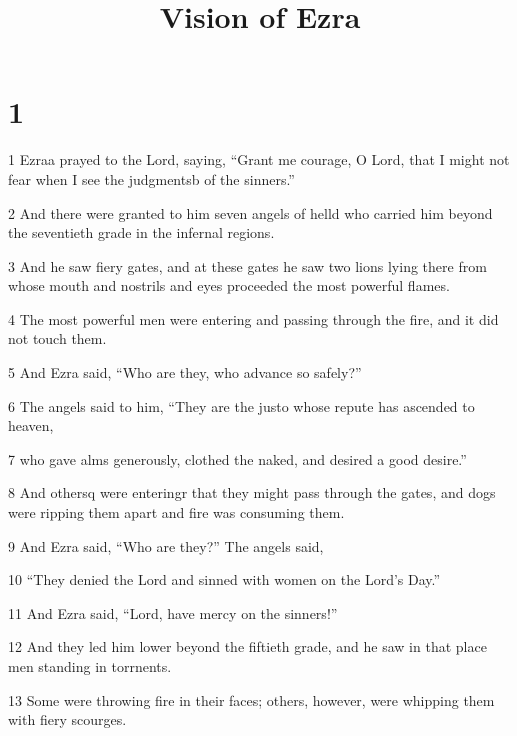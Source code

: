 

\title{Vision of Ezra}

\chapter{1}

\par 1 Ezraa prayed to the Lord, saying, “Grant me courage, O Lord, that I might not fear when I see the judgmentsb of the sinners.”

\par 2 And there were granted to him seven angels of helld who carried him beyond the seventieth grade in the infernal regions.

\par 3 And he saw fiery gates, and at these gates he saw two lions lying there from whose mouth and nostrils and eyes proceeded the most powerful flames.

\par 4 The most powerful men were entering and passing through the fire, and it did not touch them. 

\par 5 And Ezra said, “Who are they, who advance so safely?” 

\par 6 The angels said to him, “They are the justo whose repute has ascended to heaven,

\par 7 who gave alms generously, clothed the naked, and desired a good desire.” 

\par 8 And othersq were enteringr that they might pass through the gates, and dogs were ripping them apart and fire was consuming them.

\par 9 And Ezra said, “Who are they?” The angels said,

\par 10 “They denied the Lord and sinned with women on the Lord's Day.”

\par 11 And Ezra said, “Lord, have mercy on the sinners!”

\par 12 And they led him lower beyond the fiftieth grade, and he saw in that place men standing in torrnents.

\par 13 Some were throwing fire in their faces; others, however, were whipping them with fiery scourges.

